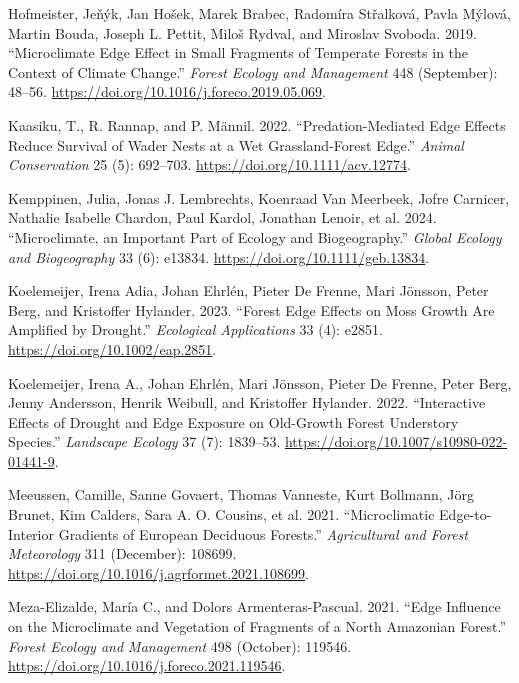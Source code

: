 \documentclass[
  12pt,
]{article}
\newlength{\cslhangindent}
\newenvironment{CSLReferences}[2] %
 {\begin{list}{}{%
  \setlength{\itemindent}{0pt}
  \setlength{\leftmargin}{0pt}
  \setlength{\parsep}{0pt}
  \ifodd #1
   \setlength{\leftmargin}{\cslhangindent}
   \setlength{\itemindent}{-1\cslhangindent}
  \fi
  \setlength{\itemsep}{#2\baselineskip}}}
 {\end{list}}
\begin{document}
\begin{CSLReferences}{1}{0}
Hofmeister, Jeňýk, Jan Hošek, Marek Brabec, Radomíra Střalková, Pavla
Mýlová, Martin Bouda, Joseph L. Pettit, Miloš Rydval, and Miroslav
Svoboda. 2019. {``Microclimate Edge Effect in Small Fragments of
Temperate Forests in the Context of Climate Change.''} \emph{Forest
Ecology and Management} 448 (September): 48--56.
\url{https://doi.org/10.1016/j.foreco.2019.05.069}.

Kaasiku, T., R. Rannap, and P. Männil. 2022. {``Predation-Mediated Edge
Effects Reduce Survival of Wader Nests at a Wet Grassland-Forest
Edge.''} \emph{Animal Conservation} 25 (5): 692--703.
\url{https://doi.org/10.1111/acv.12774}.

Kemppinen, Julia, Jonas J. Lembrechts, Koenraad Van Meerbeek, Jofre
Carnicer, Nathalie Isabelle Chardon, Paul Kardol, Jonathan Lenoir, et
al. 2024. {``Microclimate, an Important Part of Ecology and
Biogeography.''} \emph{Global Ecology and Biogeography} 33 (6): e13834.
\url{https://doi.org/10.1111/geb.13834}.

Koelemeijer, Irena Adia, Johan Ehrlén, Pieter De Frenne, Mari Jönsson,
Peter Berg, and Kristoffer Hylander. 2023. {``Forest Edge Effects on
Moss Growth Are Amplified by Drought.''} \emph{Ecological Applications}
33 (4): e2851. \url{https://doi.org/10.1002/eap.2851}.

Koelemeijer, Irena A., Johan Ehrlén, Mari Jönsson, Pieter De Frenne,
Peter Berg, Jenny Andersson, Henrik Weibull, and Kristoffer Hylander.
2022. {``Interactive Effects of Drought and Edge Exposure on Old-Growth
Forest Understory Species.''} \emph{Landscape Ecology} 37 (7): 1839--53.
\url{https://doi.org/10.1007/s10980-022-01441-9}.

Meeussen, Camille, Sanne Govaert, Thomas Vanneste, Kurt Bollmann, Jörg
Brunet, Kim Calders, Sara A. O. Cousins, et al. 2021. {``Microclimatic
Edge-to-Interior Gradients of {European} Deciduous Forests.''}
\emph{Agricultural and Forest Meteorology} 311 (December): 108699.
\url{https://doi.org/10.1016/j.agrformet.2021.108699}.

Meza-Elizalde, María C., and Dolors Armenteras-Pascual. 2021. {``Edge
Influence on the Microclimate and Vegetation of Fragments of a North
{Amazonian} Forest.''} \emph{Forest Ecology and Management} 498
(October): 119546. \url{https://doi.org/10.1016/j.foreco.2021.119546}.


\end{CSLReferences}
\end{document}
